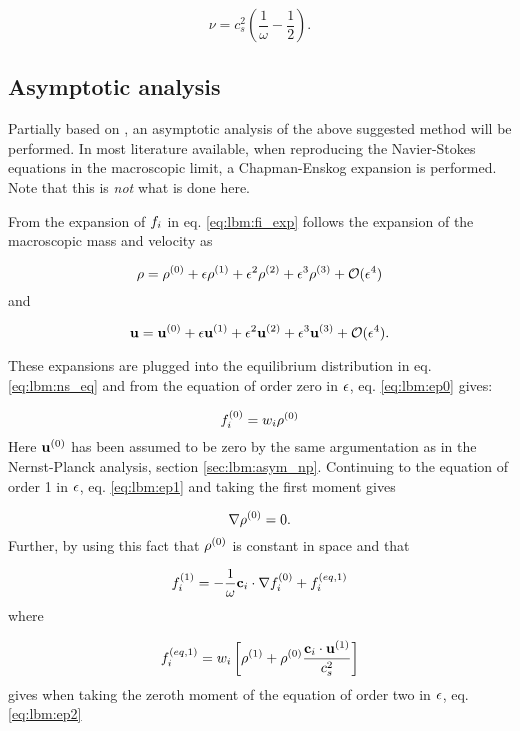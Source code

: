 \begin{equation}\label{eq:lbm:nu}
\nu = c_s^2\left( \frac{1}{\omega} - \frac{1}{2} \right).
\end{equation}

\subsection{Asymptotic analysis}\label{sec:lbm:asym_ns}
Partially based on \cite{junk-asym}, an asymptotic analysis of the
above suggested method will be performed. In most literature
available, when reproducing the Navier-Stokes equations in the
macroscopic limit, a Chapman-Enskog expansion is performed. Note that
this is \emph{not} what is done here.

From the expansion of $f_i$ in eq. \eqref{eq:lbm:fi_exp} follows the
expansion of the macroscopic mass and velocity as

\begin{equation}\label{eq:lbm:ns_rho_exp}
\rho = \rho^{(0)} + \epsilon\rho^{(1)} + \epsilon^2\rho^{(2)} + \epsilon^3\rho^{(3)} +
\mathcal{O}(\epsilon^4)
\end{equation} 
and

\begin{equation}
\mathbf{u} = \mathbf{u}^{(0)} + \epsilon\mathbf{u}^{(1)} + \epsilon^2\mathbf{u}^{(2)} + \epsilon^3\mathbf{u}^{(3)} + \mathcal{O}(\epsilon^4).
\end{equation}

These expansions are plugged into the equilibrium distribution in
eq. \eqref{eq:lbm:ns_eq} and from the equation of order zero in $\epsilon$,
eq. \eqref{eq:lbm:ep0} gives:

\begin{equation}
  f_i^{(0)} = w_i \rho^{(0)}
\end{equation}
Here $\mathbf{u}^{(0)}$ has been assumed to be zero by the same argumentation as
in the Nernst-Planck analysis, section
\ref{sec:lbm:asym_np}. Continuing to the equation of order 1 in $\epsilon$,
eq. \eqref{eq:lbm:ep1} and taking the first moment gives

\begin{equation}\label{eq:lbm:ns_rhoe0}
\nabla \rho^{(0)} = 0.
\end{equation}
Further, by using this fact that $\rho^{(0)}$ is constant in space and
that

\begin{equation}
f_i^{(1)} = - \frac{1}{\omega} \mathbf{c}_i\cdot\nabla f_i^{(0)} + f_i^{(eq, 1)}
\end{equation}
where

\begin{equation}
f_i^{(eq, 1)} = w_i\left[ \rho^{(1)} + \rho^{(0)}\frac{\mathbf{c}_i \cdot \mathbf{u}^{(1)}}{c_s^2}
  \right]
\end{equation}
gives when taking the zeroth moment of the equation of order two in $\epsilon$,
eq. \eqref{eq:lbm:ep2}


